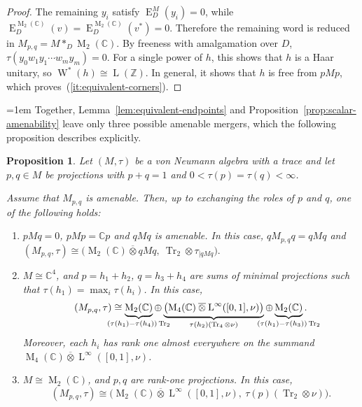 \documentclass[11pt]{amsart}
\numberwithin{equation}{section}
\newcommand{\zz}{\mathbb Z}
\newcommand{\cc}{\mathbb C}
\newcommand{\pt}{\otimes}
\newcommand{\ovt}{\mathbin{\overline{\otimes}}}
\DeclareMathOperator{\LL}{L}
\DeclareMathOperator{\Tr}{Tr}
\newcommand{\Wstar}{\operatorname{W}^*}
\newcommand{\rL}{\operatorname{L}}
\newcommand{\rE}{\operatorname{E}}
\newcommand{\rM}{\operatorname{M}}
\newtheorem{Prop}[The]{Proposition}
\theoremstyle{definition}
\begin{document}
\begin{proof}
    The remaining $y_i$ satisfy $\rE_D^M(y_i)=0$, while $\rE_D^{\rM_2(\cc)}(v)=\rE_D^{\rM_2(\cc)}(v^*)=0$. Therefore the remaining word is reduced in $M_{p,q}=M\ast_D\rM_2(\cc)$. By freeness with amalgamation over $D$, $\tau(y_0w_1y_1\cdots w_my_m)=0$. For a single power of $h$, this shows that $h$ is a Haar unitary, so $\Wstar(h)\cong\LL(\zz)$. In general, it shows that $h$ is free from $pMp$, which proves~\textup{(\ref*{it:equivalent-corners})}.
\end{proof}


{\emergencystretch=1em
Together, Lemma~\ref{lem:equivalent-endpoints} and Proposition~\ref{prop:scalar-amenability} leave only three possible amenable mergers, which the following proposition describes explicitly.\par}

\begin{Prop}
    \label{prop:amenable-merger}
    Let $(M,\tau)$ be a von Neumann algebra with a trace and let $p,q\in M$ be projections with $p+q=1$ and $0<\tau(p)=\tau(q)<\infty$. 
    
    Assume that $M_{p,q}$ is amenable. Then, up to exchanging the roles of $p$ and $q$, one of the following holds:
    \begin{enumerate}[\rm (i)]
        \item $pMq=0$, $pMp=\cc p$ and $qMq$ is amenable.  In this case, $qM_{p,q}q=qMq$ and $(M_{p,q},\tau)\cong\bigl(\rM_2(\cc)\ovt qMq,\ \Tr_2\pt\tau_{\mid qMq}\bigr).$
        \item $M\cong\cc^4$, and $p=h_1+h_2$, $q=h_3+h_4$ are sums of minimal projections such that $\tau(h_1)=\max_i\tau(h_i)$. In this case, $$\displaystyle (M_{p,q},\tau)\cong\underbrace{\rM_2(\cc)}_{\mathclap{(\tau(h_1)-\tau(h_4))\Tr_2}}\oplus\underbrace{\bigl(\rM_4(\cc)\ovt\rL^\infty([0,1],\nu)\bigr)}_{\tau(h_2)(\Tr_4\pt\nu)}\oplus\underbrace{\rM_2(\cc)}_{\mathclap{(\tau(h_1)-\tau(h_3))\Tr_2}}.$$ Moreover, each $h_i$ has rank one almost everywhere on the summand $\rM_4(\cc)\ovt\rL^\infty([0,1],\nu)$.
        \item $M\cong\rM_2(\cc)$, and $p,q$ are rank-one projections. In this case, $$(M_{p,q},\tau)\cong\bigl(\rM_2(\cc)\ovt\rL^\infty([0,1],\nu),\ \tau(p)(\Tr_2\pt\nu)\bigr).$$
    \end{enumerate}
\end{Prop}
\end{document}

